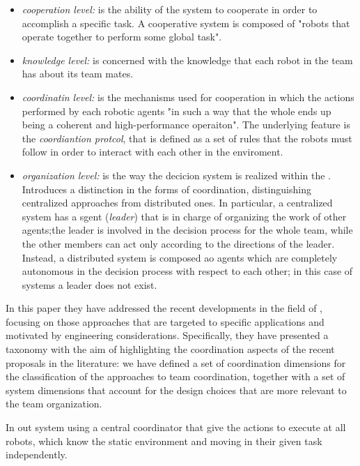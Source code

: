 \begin{itemize}
    \item \textit{cooperation level:} is the ability of the system to cooperate in order 
    to accomplish a specific task. A cooperative system is composed of "robots that operate together
    to perform some global task". 
    \item \textit{knowledge level:} is concerned with the knowledge that each robot in the team
    has about its team mates.
    \item \textit{coordinatin level:} is the mechanisms used for cooperation in which the actions performed by each 
    robotic agents "in such a way that the whole ends up being a coherent and high-performance operaiton".
    The underlying feature is the \textit{coordiantion protcol}, that is defined as a set
    of rules that the robots must follow in order to interact with each other in the enviroment. 
    \item \textit{organization level:} is the way the decicion system is realized within the \mrs. 
    Introduces a distinction in the forms of coordination, distinguishing centralized approaches
    from distributed ones. In particular, a centralized system has a sgent (\textit{leader}) that is in
    charge of organizing the work of other agents;the leader
    is involved in the decision process for the whole team, while
    the other members can act only according to the directions of
    the leader. 
    Instead, a distributed system is composed ao agents which are completely autonomous in the 
    decision process with respect to each other; in this case of systems a leader does not exist. 
\end{itemize}

In this paper they have addressed the recent developments in the field of \mrs, focusing 
on those approaches that are targeted to specific applications and motivated by engineering
considerations. Specifically, they have presented a taxonomy with the aim of highlighting 
the coordination aspects of the recent proposals in the literature: we have defined a set of coordination
dimensions for the classification of the approaches to team coordination, together with a set of system dimensions that account
for the design choices that are more relevant to the team organization.

In out system using a central coordinator that give the actions to execute at all robots, which know the static environment and moving in their given task independently.

